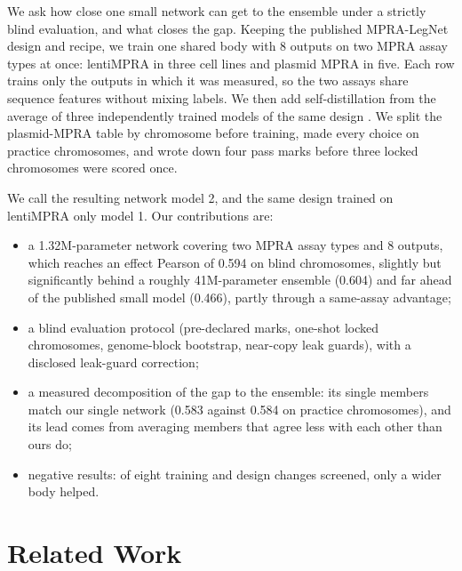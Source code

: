 \documentclass[11pt]{article}
\begin{document}
We ask how close one small network can get to the ensemble under a strictly blind evaluation, and what closes the gap. Keeping the published MPRA-LegNet design and recipe, we train one shared body with 8 outputs on two MPRA assay types at once: lentiMPRA in three cell lines and plasmid MPRA in five. Each row trains only the outputs in which it was measured, so the two assays share sequence features without mixing labels. We then add self-distillation from the average of three independently trained models of the same design \cite{hinton2015distilling,furlanello2018born}. We split the plasmid-MPRA table by chromosome before training, made every choice on practice chromosomes, and wrote down four pass marks before three locked chromosomes were scored once.

We call the resulting network model 2, and the same design trained on lentiMPRA only model 1. Our contributions are:
\begin{itemize}
\item a 1.32M-parameter network covering two MPRA assay types and 8 outputs, which reaches an effect Pearson of 0.594 on blind chromosomes, slightly but significantly behind a roughly 41M-parameter ensemble (0.604) and far ahead of the published small model (0.466), partly through a same-assay advantage;
\item a blind evaluation protocol (pre-declared marks, one-shot locked chromosomes, genome-block bootstrap, near-copy leak guards), with a disclosed leak-guard correction;
\item a measured decomposition of the gap to the ensemble: its single members match our single network (0.583 against 0.584 on practice chromosomes), and its lead comes from averaging members that agree less with each other than ours do;
\item negative results: of eight training and design changes screened, only a wider body helped.
\end{itemize}

\section{Related Work}
\end{document}

